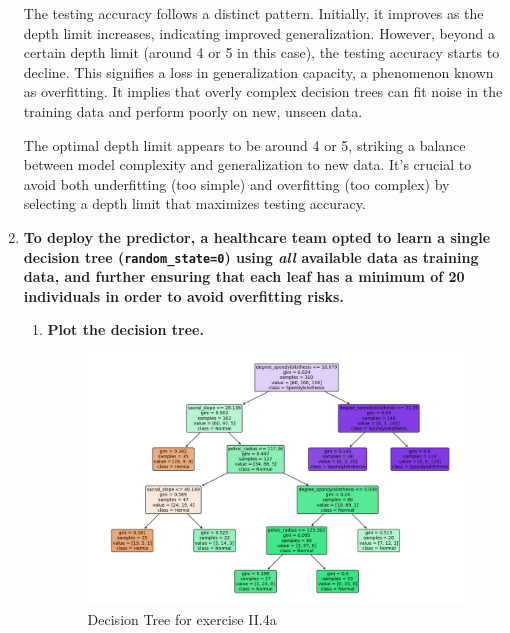 \documentclass[12pt]{article}
\begin{document}
\begin{enumerate}[leftmargin=\labelsep]
          The testing accuracy follows a distinct pattern. Initially, it improves as the depth limit
          increases, indicating improved generalization. However, beyond a certain depth limit (around 4 or 5 in this case), the testing accuracy starts to
          decline. This signifies a loss in generalization capacity, a phenomenon known as overfitting. It implies that overly complex decision trees can fit
          noise in the training data and perform poorly on new, unseen data.

          The optimal depth limit appears to be around 4 or 5, striking a balance between model complexity and generalization to new data.
          It's crucial to avoid both underfitting (too simple) and overfitting (too complex) by selecting a depth limit that maximizes testing accuracy.
          \vskip 0.3cm

    \item \textbf{To deploy the predictor, a healthcare team opted to learn a single decision tree
          (\texttt{random\_state=0}) using \textit{all} available data as training data, and further ensuring that each leaf has
          a minimum of 20 individuals in order to avoid overfitting risks.}
          \begin{enumerate}
          \item \textbf{Plot the decision tree.}

          \vskip 0.3cm
          

          \vskip -0.7cm
          \begin{figure}[H]
              \centering
              \includegraphics[width=\linewidth]{./assets/decision_tree_ex4a_PartII.png}
              \caption{Decision Tree for exercise II.4a}
              \label{fig:PartII-ex4a-plot}
          \end{figure}


\end{enumerate}
\end{enumerate}
\end{document}
